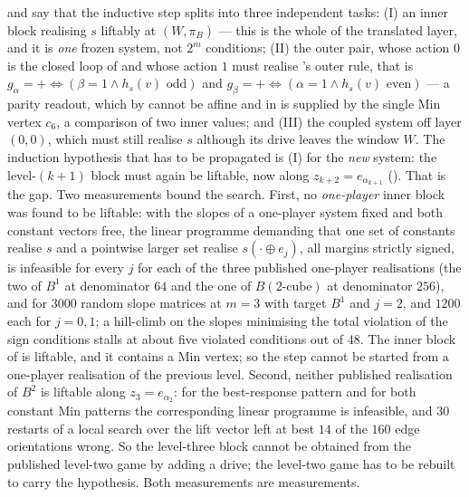 \begin{remark}\label{lvl:induction}
 and  say that the inductive step
splits into three independent tasks: (I) an inner block realising $s$ liftably
at $(W,\pi_B)$ --- this is the whole of the translated layer, and it is
\emph{one} frozen system, not $2^{m}$ conditions; (II) the outer pair, whose
action $0$ is the closed loop of  and whose action $1$ must
realise 's outer rule, that is
$g_\alpha=+\iff(\beta=1\wedge h_s(v)\text{ odd})$ and
$g_\beta=+\iff(\alpha=1\wedge h_s(v)\text{ even})$ --- a parity readout, which
by  cannot be affine and in
 is supplied by the single Min vertex $c_6$, a
comparison of two inner values; and (III) the coupled system off layer
$(0,0)$, which must still realise $s$ although its drive leaves the window $W$.
The induction hypothesis that has to be propagated is (I) for the \emph{new}
system: the level-$(k+1)$ block must again be liftable, now along
$z_{k+2}=e_{\alpha_{k+1}}$ ().  That is the gap.
Two measurements bound the search.  First, no \emph{one-player} inner block
was found to be liftable: with the slopes of a one-player system fixed and both
constant vectors free, the linear programme demanding that one set of constants
realise $s$ and a pointwise larger set realise $s(\cdot\oplus e_j)$, all
margins strictly signed, is infeasible for every $j$ for each of the three
published one-player realisations (the two of $B^{1}$ at denominator $64$ and
the one of $B(\text{$2$-cube})$ at denominator $256$), and for $3000$ random
slope matrices at $m=3$ with target $B^{1}$ and $j=2$, and $1200$ each for
$j=0,1$; a hill-climb on the slopes minimising the total violation of the sign
conditions stalls at about five violated conditions out of $48$.  The inner block of
 is liftable, and it contains a Min vertex; so the step
cannot be started from a one-player realisation of the previous level.
Second, neither published realisation of $B^{2}$ is liftable along
$z_3=e_{\alpha_2}$: for the best-response pattern and for both constant Min
patterns the corresponding linear programme is infeasible, and $30$ restarts of
a local search over the lift vector left at best $14$ of the $160$ edge
orientations wrong.  So the level-three block cannot be obtained from the
published level-two game by adding a drive; the level-two game has to be
rebuilt to carry the hypothesis.  Both measurements are measurements.
\end{remark}

